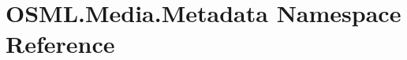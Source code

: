 \hypertarget{namespaceOSML_1_1Media_1_1Metadata}{}\section{O\+S\+M\+L.\+Media.\+Metadata Namespace Reference}
\label{namespaceOSML_1_1Media_1_1Metadata}
